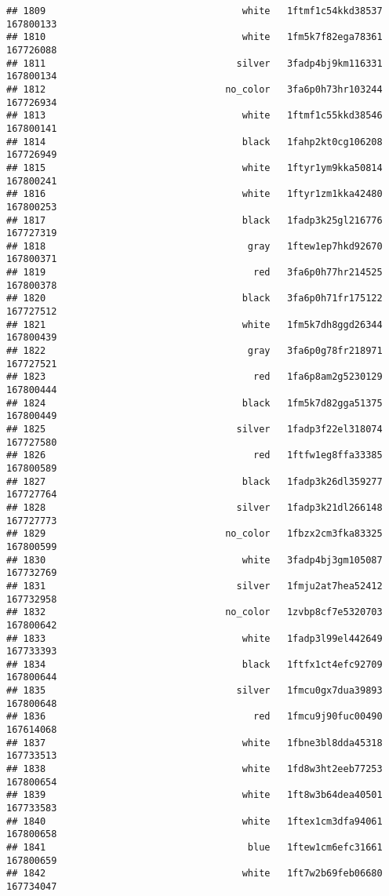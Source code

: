 \documentclass[
]{article}
\begin{document}
\begin{verbatim}
## 1809                                   white   1ftmf1c54kkd38537 167800133
## 1810                                   white   1fm5k7f82ega78361 167726088
## 1811                                  silver   3fadp4bj9km116331 167800134
## 1812                                no_color   3fa6p0h73hr103244 167726934
## 1813                                   white   1ftmf1c55kkd38546 167800141
## 1814                                   black   1fahp2kt0cg106208 167726949
## 1815                                   white   1ftyr1ym9kka50814 167800241
## 1816                                   white   1ftyr1zm1kka42480 167800253
## 1817                                   black   1fadp3k25gl216776 167727319
## 1818                                    gray   1ftew1ep7hkd92670 167800371
## 1819                                     red   3fa6p0h77hr214525 167800378
## 1820                                   black   3fa6p0h71fr175122 167727512
## 1821                                   white   1fm5k7dh8ggd26344 167800439
## 1822                                    gray   3fa6p0g78fr218971 167727521
## 1823                                     red   1fa6p8am2g5230129 167800444
## 1824                                   black   1fm5k7d82gga51375 167800449
## 1825                                  silver   1fadp3f22el318074 167727580
## 1826                                     red   1ftfw1eg8ffa33385 167800589
## 1827                                   black   1fadp3k26dl359277 167727764
## 1828                                  silver   1fadp3k21dl266148 167727773
## 1829                                no_color   1fbzx2cm3fka83325 167800599
## 1830                                   white   3fadp4bj3gm105087 167732769
## 1831                                  silver   1fmju2at7hea52412 167732958
## 1832                                no_color   1zvbp8cf7e5320703 167800642
## 1833                                   white   1fadp3l99el442649 167733393
## 1834                                   black   1ftfx1ct4efc92709 167800644
## 1835                                  silver   1fmcu0gx7dua39893 167800648
## 1836                                     red   1fmcu9j90fuc00490 167614068
## 1837                                   white   1fbne3bl8dda45318 167733513
## 1838                                   white   1fd8w3ht2eeb77253 167800654
## 1839                                   white   1ft8w3b64dea40501 167733583
## 1840                                   white   1ftex1cm3dfa94061 167800658
## 1841                                    blue   1ftew1cm6efc31661 167800659
## 1842                                   white   1ft7w2b69feb06680 167734047

\end{verbatim}
\end{document}
